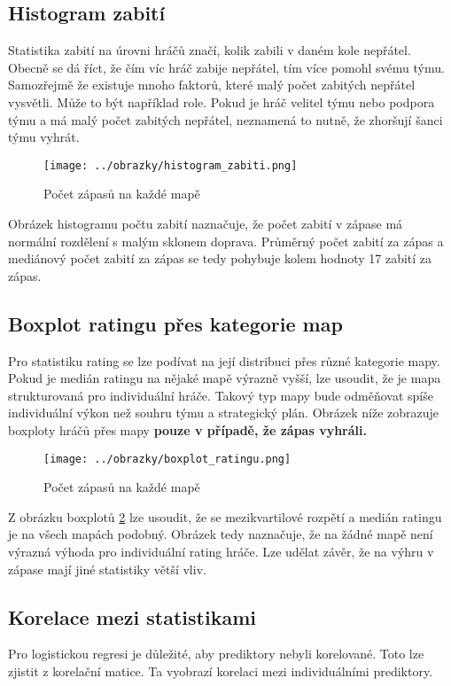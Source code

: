 \subsection{Histogram zabití}
Statistika zabití na úrovni hráčů značí, kolik zabili v daném kole nepřátel. Obecně se dá říct, že čím víc hráč zabije nepřátel, tím více pomohl svému týmu.
Samozřejmě že existuje mnoho faktorů, které malý počet zabitých nepřátel vysvětli. Může to být například role. Pokud je hráč velitel týmu nebo podpora týmu a má malý
počet zabitých nepřátel, neznamená to nutně, že zhoršují šanci týmu vyhrát.

\begin{figure}[H]
    \centering
    \texttt{[image: ../obrazky/histogram\_zabiti.png]}
    \caption{Počet zápasů na každé mapě} 
    \label{fig:histogram_zabiti}
\end{figure}

Obrázek histogramu počtu zabití naznačuje, že počet zabití v zápase má normální rozdělení s malým sklonem doprava. Průměrný počet zabití za zápas a mediánový
počet zabití za zápas se tedy pohybuje kolem hodnoty 17 zabití za zápas.

\subsection{Boxplot ratingu přes kategorie map}
Pro statistiku rating se lze podívat na její distribuci přes různé kategorie mapy. Pokud je medián ratingu na nějaké mapě výrazně vyšší, lze usoudit,
že je mapa strukturovaná pro individuální hráče. Takový typ mapy bude odměňovat spíše individuální výkon než souhru týmu a strategický plán. Obrázek níže
zobrazuje boxploty hráčů přes mapy \textbf{pouze v případě, že zápas vyhráli.}

\begin{figure}[H]
    \centering
    \texttt{[image: ../obrazky/boxplot\_ratingu.png]}
    \caption{Počet zápasů na každé mapě} 
    \label{fig:boxplot_ratingu_pres_mapu}
\end{figure}

Z obrázku boxplotů \ref{fig:boxplot_ratingu_pres_mapu} lze usoudit, že se mezikvartilové rozpětí a medián ratingu je na všech mapách podobný. Obrázek tedy naznačuje,
že na žádné mapě není výrazná výhoda pro individuální rating hráče. Lze udělat závěr, že na výhru v zápase mají jiné statistiky větší vliv.

\subsection{Korelace mezi statistikami}
Pro logistickou regresi je důležité, aby prediktory nebyli korelované. Toto lze zjistit z korelační matice. Ta vyobrazí korelaci mezi individuálními prediktory.


